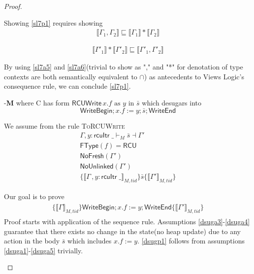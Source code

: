\begin{proof}
\begin{case}
Showing \ref{sl7p1} requires showing 
\begin{gather}\label{sl7a5}
\llbracket \Gamma_1,\Gamma_2 \rrbracket \sqsubseteq \llbracket \Gamma_1\rrbracket * \llbracket  \Gamma_2 \rrbracket
\end{gather}

\begin{gather}\label{sl7a6}
\llbracket \Gamma'_1 \rrbracket * \llbracket \Gamma'_2 \rrbracket \sqsubseteq \llbracket \Gamma'_1, \Gamma'_2 \rrbracket
\end{gather}

By using \ref{sl7a5} and \ref{sl7a6}(trivial to show as "," and "*" for denotation of type contexts are both semantically equivalent to $\cap$) as antecedents to Views Logic's consequence rule, we can conclude \ref{sl7p1}.
\end{case}
\begin{case}-\textbf{M} where C has form $\textsf{RCUWrite}\, x.f \text{ as } y \text{ in } \bar{s}$
  which desugars into
  \[\textsf{WriteBegin}; x.f:= y ; \bar{s} ;\textsf{WriteEnd}\]

  We assume from the rule \textsc{ToRCUWrite}
 \begin{gather}\label{dsuga1}
       \Gamma, y:\textsf{rcuItr}\;\_ \vdash_{M} \bar{s} \dashv \Gamma' \\
       \label{dsuga2}
       \textsf{FType}(f) = \textsf{RCU} \\
       \label{dsuga3}
       \textsf{NoFresh}(\Gamma') \\
       \label{dsuga4}
       \textsf{NoUnlinked}(\Gamma')\\
        \label{dsuga5}
       \{\llbracket \Gamma\,, y:\textsf{rcuItr}\;\_ \rrbracket_{M,tid} \}  \bar{s}  \{\llbracket \Gamma' \rrbracket_{M,tid}\}
      \end{gather}
      
    Our goal is to prove
    \begin{gather}\label{dsugp1}
      \begin{array}{l}
      \{\llbracket \Gamma \rrbracket_{M,tid} \} 
      \textsf{WriteBegin}; x.f:= y  ;\textsf{WriteEnd}
      \{\llbracket \Gamma' \rrbracket_{M,tid} \}
      \end{array}
    \end{gather}
   Proof starts with application of the sequence rule. Assumptions \ref{dsuga3}-\ref{dsuga4} guarantee that there exists no change in the state(no heap update) due to any action in the body $\bar{s}$ which includes $x.f:=y$. \ref{dsugp1} follows from assumptions \ref{dsuga1}-\ref{dsuga5} trivially.
\end{case}
\end{proof}
